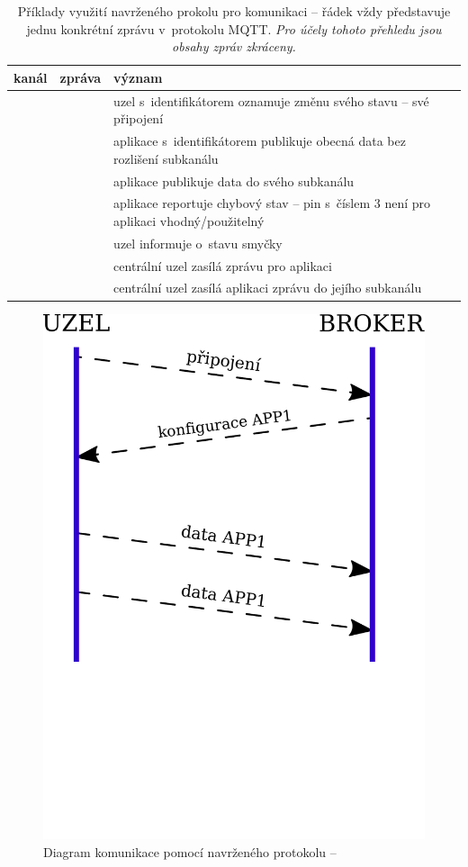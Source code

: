 \begin{table}
    \centering
    \caption{Příklady využití navrženého prokolu pro komunikaci -- řádek vždy představuje jednu konkrétní zprávu
    v~protokolu MQTT. \textit{Pro účely tohoto přehledu jsou obsahy zpráv zkráceny.}}
    \begin{tabularx}{\textwidth}{@{}sls@{}}
        \toprule
        \textbf{kanál} & \textbf{zpráva} & \textbf{význam} \\
        \hline
         &  & uzel s~identifikátorem  oznamuje změnu
        svého stavu -- své připojení \\
        \midrule
         &  & aplikace s~identifikátorem  publikuje
        obecná data bez rozlišení subkanálu \\
        \midrule
         &  & aplikace publikuje data do svého
        subkanálu  \\
        \midrule
         &  & aplikace reportuje chybový
        stav -- pin s~číslem 3 není pro aplikaci vhodný/použitelný \\
        \midrule
         &  & uzel informuje o~stavu
        smyčky\footnotemark \\
        \midrule
         &  & centrální uzel zasílá zprávu pro aplikaci
         \\
        \midrule
         &  & centrální uzel zasílá aplikaci
         zprávu do jejího subkanálu  \\
        \bottomrule
    \end{tabularx}
    \label{table:protocol-examples}
\end{table}

\begin{figure}
    \centering
    \includegraphics[width=.5\textwidth]{figures/messages-in-time.pdf}
    \caption{Diagram komunikace pomocí navrženého protokolu -- }
\end{figure}